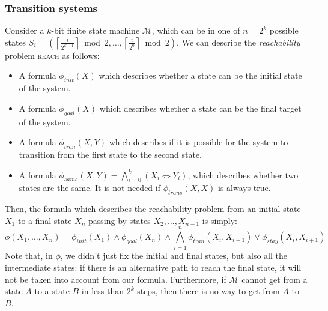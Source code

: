 \documentclass{article}
\theoremstyle{example}
\theoremstyle{remark}
\renewcommand{\iff}{\Leftrightarrow}
\begin{document}
\subsubsection{Transition systems}
Consider a \(k\)-bit finite state machine \(\mathcal{M}\), which can be in one of \(n = 2^k\)
possible states \(S_i = \left( \left\lceil{\frac{i}{2^{k-1}}}\right\rceil \bmod 2, \dots,
\left\lceil{\frac{i}{2^{0}}}\right\rceil \bmod 2\right)\).
We can describe the \emph{reachability} problem \textsc{reach} as follows:
\begin{itemize}
	\item A formula \(\phi_{init}\left(X\right)\) which describes whether a state can be the initial
	      state of the system.
	\item A formula \(\phi_{goal}\left(X\right)\) which describes whether a state can be the final
	      target of the system.
	\item A formula \(\phi_{tran}\left(X, Y\right)\) which describes if it is possible for the system
	      to transition from the first state to the second state.
	\item A formula \(\phi_{same}\left(X, Y\right) = \bigwedge_{i=0}^{k}\left(X_i \iff Y_i\right)\),
	      which describes whether two states are the same.
	      It is not needed if \(\phi_{trans}\left(X,X\right)\) is always true.
\end{itemize}
Then, the formula which describes the reachability problem from an initial state \(X_1\) to a
final state \(X_n\) passing by states \(X_2, \dots, X_{n-1}\) is simply:
\[
	\phi(X_1, \dots, X_n) = \phi_{init}\left(X_1\right) \wedge \phi_{goal}\left(X_n\right) \wedge
	\bigwedge_{i=1}^{n}{\phi_{tran}\left(X_i, X_{i+1}\right) \lor \phi_{stay}(X_i, X_{i+1})}
\]
Note that, in \(\phi \), we didn't just fix the initial and final states, but also all the
intermediate states: if there is an alternative path to reach the final state, it will not be
taken into account from our formula.
Furthermore, if \(\mathcal{M}\) cannot get from a state \(A\) to a state \(B\) in less than
\(2^k\) steps, then there is no way to get from \(A\) to \(B\).
\end{document}
